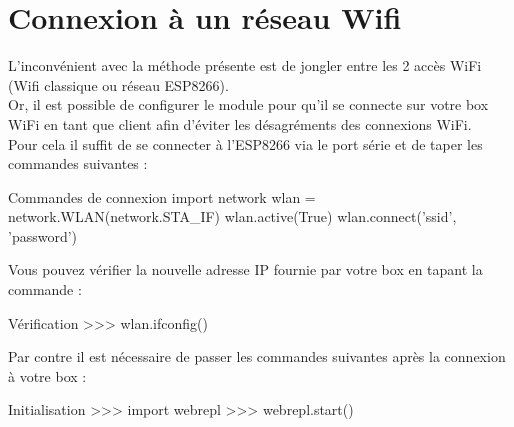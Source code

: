 \chapter{Connexion à un réseau Wifi}

L’inconvénient avec la méthode présente est de jongler entre les 2 accès WiFi (Wifi classique ou réseau ESP8266).\\
Or, il est possible de configurer le module pour qu’il se connecte sur votre box WiFi en tant que client afin d'éviter les désagréments des connexions WiFi. \\
Pour cela il suffit de se connecter à l'ESP8266 via le port série et de taper les commandes suivantes : 
\begin{Bash}{Commandes de connexion}
import network
wlan = network.WLAN(network.STA_IF)
wlan.active(True)
wlan.connect('ssid', 'password')
\end{Bash}

Vous pouvez vérifier la nouvelle adresse IP fournie par votre box en tapant la commande :
\begin{Bash}{Vérification}
>>> wlan.ifconfig()
\end{Bash}

Par contre il est nécessaire de passer les commandes suivantes après la connexion à votre box :

\begin{Bash}{Initialisation}
>>> import webrepl
>>> webrepl.start()
\end{Bash}

